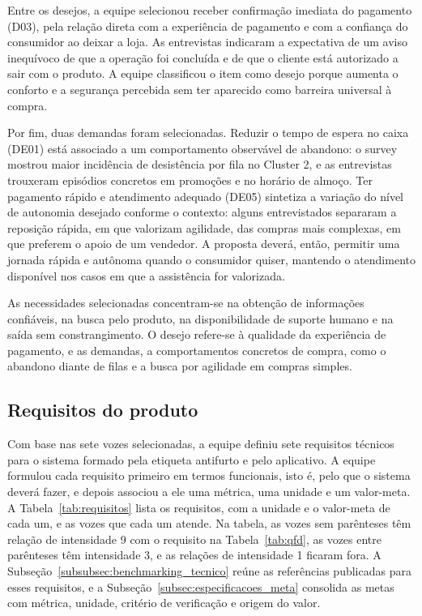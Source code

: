 Entre os desejos, a equipe selecionou receber confirmação imediata do pagamento (D03), pela relação direta com a experiência de pagamento e com a confiança do consumidor ao deixar a loja. As entrevistas indicaram a expectativa de um aviso inequívoco de que a operação foi concluída e de que o cliente está autorizado a sair com o produto. A equipe classificou o item como desejo porque aumenta o conforto e a segurança percebida sem ter aparecido como barreira universal à compra.

Por fim, duas demandas foram selecionadas. Reduzir o tempo de espera no caixa (DE01) está associado a um comportamento observável de abandono: o survey mostrou maior incidência de desistência por fila no Cluster 2, e as entrevistas trouxeram episódios concretos em promoções e no horário de almoço. Ter pagamento rápido e atendimento adequado (DE05) sintetiza a variação do nível de autonomia desejado conforme o contexto: alguns entrevistados separaram a reposição rápida, em que valorizam agilidade, das compras mais complexas, em que preferem o apoio de um vendedor. A proposta deverá, então, permitir uma jornada rápida e autônoma quando o consumidor quiser, mantendo o atendimento disponível nos casos em que a assistência for valorizada.

As necessidades selecionadas concentram-se na obtenção de informações confiáveis, na busca pelo produto, na disponibilidade de suporte humano e na saída sem constrangimento. O desejo refere-se à qualidade da experiência de pagamento, e as demandas, a comportamentos concretos de compra, como o abandono diante de filas e a busca por agilidade em compras simples.

\subsection{Requisitos do produto}
\label{subsec:requisitos_do_produto}

Com base nas sete vozes selecionadas, a equipe definiu sete requisitos técnicos para o sistema formado pela etiqueta antifurto e pelo aplicativo. A equipe formulou cada requisito primeiro em termos funcionais, isto é, pelo que o sistema deverá fazer, e depois associou a ele uma métrica, uma unidade e um valor-meta. A Tabela~\ref{tab:requisitos} lista os requisitos, com a unidade e o valor-meta de cada um, e as vozes que cada um atende. Na tabela, as vozes sem parênteses têm relação de intensidade 9 com o requisito na Tabela~\ref{tab:qfd}, as vozes entre parênteses têm intensidade 3, e as relações de intensidade 1 ficaram fora. A Subseção~\ref{subsubsec:benchmarking_tecnico} reúne as referências publicadas para esses requisitos, e a Subseção~\ref{subsec:especificacoes_meta} consolida as metas com métrica, unidade, critério de verificação e origem do valor.

